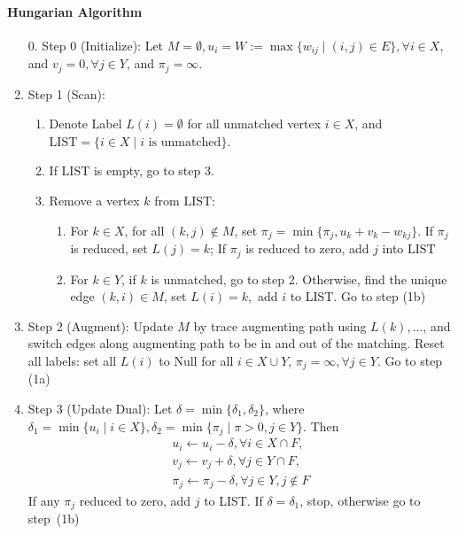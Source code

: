\paragraph{Hungarian Algorithm}
\begin{enumerate}
\item[0.]
Step 0 (Initialize): Let $M=\emptyset,u_i=W:=\max\{w_{ij}\mid(i,j)\in E\},\forall i\in X$, and $v_j=0,\forall j\in Y$, and $\pi_j=\infty$.
\item
Step 1 (Scan):
\begin{enumerate}
\item
Denote Label $L(i)=\emptyset$ for all unmatched vertex $i\in X$, and $\text{LIST}=\{i\in X\mid\text{$i$ is unmatched}\}$.
\item
If $\text{LIST}$ is empty, go to step 3.
\item
Remove a vertex $k$ from $\text{LIST}$:
\begin{enumerate}
\item
For $k\in X$, for all $(k,j)\notin M$, set $\pi_j=\min\{\pi_j,u_k+v_k-w_{kj}\}$.
If $\pi_j$ is reduced, set $L(j)=k$;
If $\pi_j$ is reduced to zero, add $j$ into $\text{LIST}$
\item
For $k\in Y$, if $k$ is unmatched, go to step 2.
Otherwise, find the unique edge $(k,i)\in M$, set $L(i)=k,$ add $i$ to LIST.
Go to step (1b)
\end{enumerate}
\end{enumerate}
\item
Step 2 (Augment):
Update $M$ by trace augmenting path using $L(k),\dots$, and switch edges along augmenting path to be in and out of the matching.
Reset all labels: set all $L(i)$ to Null for all $i\in X\cup Y$, $\pi_j=\infty,\forall j\in Y$.
Go to step (1a)
\item
Step 3 (Update Dual):
Let $\delta=\min\{\delta_1,\delta_2\}$, where $\delta_1=\min\{u_i\mid i\in X\},\delta_2=\min\{\pi_j\mid \pi>0,j\in Y\}$.
Then 
\[
\begin{array}{l}
u_i\leftarrow u_i-\delta,\forall i\in X\cap F,\\
v_j\leftarrow v_j+\delta,\forall j\in Y\cap F,\\
\pi_j\leftarrow\pi_j-\delta,\forall j\in Y,j\notin F
\end{array}
\]
If any $\pi_j$ reduced to zero, add $j$ to LIST. 
If $\delta=\delta_1$, stop, otherwise go to step~(1b)
\end{enumerate}






















